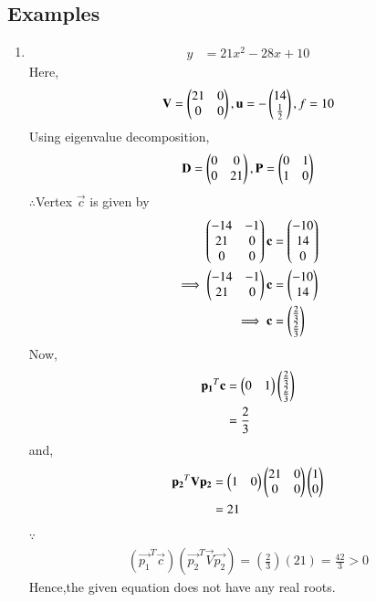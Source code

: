 \subsection{Examples}
\begin{enumerate}
    \item 
    \begin{align}
        y &= 21x^2-28x+10
    \end{align}
    Here,
    \begin{align}
        \mathbf{V} = \begin{pmatrix}21 & 0 \\ 0 & 0\end{pmatrix},\mathbf{u}=-\begin{pmatrix}14 \\ \frac{1}{2}\end{pmatrix},f=10
    \end{align}
    Using eigenvalue decomposition,
    \begin{align}
        \mathbf{D} = \begin{pmatrix}0 & 0\\0 & 21\end{pmatrix} ,\mathbf{P}=\begin{pmatrix}0 & 1\\1 & 0\end{pmatrix}
    \end{align}
    $\therefore$Vertex $\vec{c}$ is given by
    \begin{align}
        \begin{pmatrix}-14 & -1 \\ 21 & 0 \\ 0 & 0\end{pmatrix}\mathbf{c} &= \begin{pmatrix}-10 \\ 14 \\ 0\end{pmatrix} \\
        \implies  \begin{pmatrix}-14 & -1 \\ 21 & 0\end{pmatrix}\mathbf{c} &= \begin{pmatrix}-10 \\ 14\end{pmatrix}
        \\
        \implies \mathbf{c} &= \begin{pmatrix}\frac{2}{3} \\ \frac{2}{3}\end{pmatrix}
    \end{align}
    Now,
    \begin{align}
        \mathbf{p_1}^T\mathbf{c} &= \begin{pmatrix}0 & 1\end{pmatrix}\begin{pmatrix}\frac{2}{3} \\ \frac{2}{3}\end{pmatrix}
        \\
        &= \frac{2}{3}
    \end{align}
    and,
    \begin{align}
        \mathbf{p_2}^T\mathbf{V}\mathbf{p_2} &= \begin{pmatrix}1 & 0\end{pmatrix}\begin{pmatrix}21 & 0\\0& 0\end{pmatrix}\begin{pmatrix}1 \\ 0\end{pmatrix}
        \\
        &= 21
    \end{align}
    $\because$
    \begin{align}
    (\vec{p_1}^T\vec{c})(\vec{p_2}^T\vec{V}\vec{p_2}) = (\frac{2}{3})(21) = \frac{42}{3}>0
    \end{align}
    Hence,the given equation does not have any real roots.
    

\end{enumerate}
